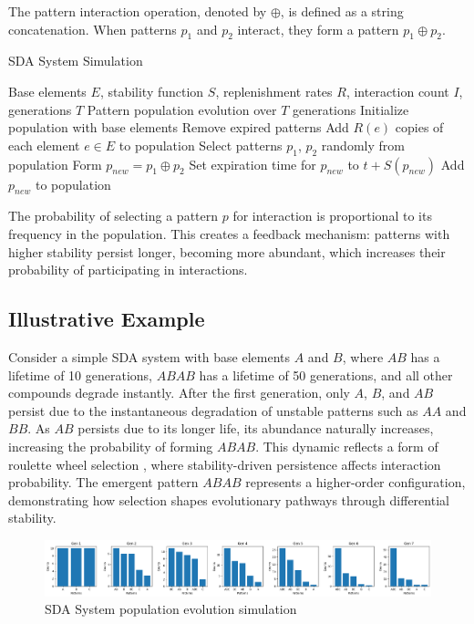 \documentclass[preprint,12pt]{elsarticle}
\begin{document}
The pattern interaction operation, denoted by $\oplus$, is defined as a string concatenation. When patterns $p_1$ and $p_2$ interact, they form a pattern $p_1 \oplus p_2$.

\begin{algorithm}[H]
\caption{SDA System Simulation}
\footnotesize
\begin{algorithmic}[1]
\REQUIRE Base elements $E$, stability function $S$, replenishment rates $R$, interaction count $I$, generations $T$
\ENSURE Pattern population evolution over $T$ generations
\STATE Initialize population with base elements
   \STATE Remove expired patterns
   \STATE Add $R(e)$ copies of each element $e \in E$ to population
       \STATE Select patterns $p_1$, $p_2$ randomly from population
       \STATE Form $p_{new} = p_1 \oplus p_2$
       \STATE Set expiration time for $p_{new}$ to $t + S(p_{new})$
       \STATE Add $p_{new}$ to population
   \ENDFOR
\ENDFOR
\end{algorithmic}
\end{algorithm}

The probability of selecting a pattern $p$ for interaction is proportional to its frequency in the population. This creates a feedback mechanism: patterns with higher stability persist longer, becoming more abundant, which increases their probability of participating in interactions.

\subsection{Illustrative Example}

Consider a simple SDA system with base elements \( A \) and \( B \), where \( AB \) has a lifetime of 10 generations, \( ABAB \) has a lifetime of 50 generations, and all other compounds degrade instantly. After the first generation, only \( A \), \( B \), and \( AB \) persist due to the instantaneous degradation of unstable patterns such as \( AA \) and \( BB \). As \( AB \) persists due to its longer life, its abundance naturally increases, increasing the probability of forming \( ABAB \). This dynamic reflects a form of roulette wheel selection \cite{goldberg1989genetic, holland1975adaptation}, where stability-driven persistence affects interaction probability. The emergent pattern \( ABAB \) represents a higher-order configuration, demonstrating how selection shapes evolutionary pathways through differential stability.

\begin{figure}[htp]
    \centering
    \includegraphics[width=1\textwidth]{figure_2}
    \caption{SDA System population evolution simulation}
    \label{fig:figure_2}
\end{figure}
\end{document}
